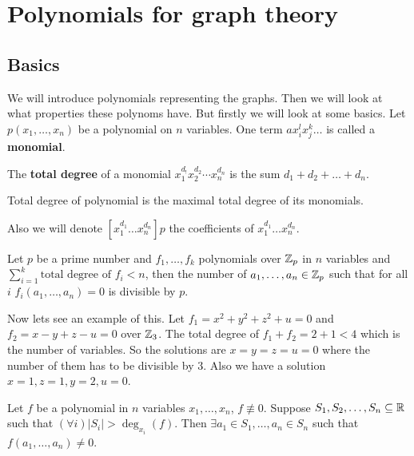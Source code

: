 \chapter{Polynomials for graph theory}

\section{Basics}

We will introduce polynomials representing the graphs. Then we will look at what properties these polynoms have. But firstly we will look at some basics. Let $p(x_{1}, \dots, x_{n})$ be a polynomial on $n$ variables. One term $ax_{i}^{l} x_{j}^k \dots$ is called a \textbf{monomial}.

\begin{defn}
	The \textbf{total degree} of a monomial $x_{1}^{d_{!}} x_{2}^{d_{2}} \cdots x_{n}^{d_{n}}$ is the sum $d_{1} + d_{2} + \dots + d_{n}$.
\end{defn}

\begin{defn}
	Total degree of polynomial is the maximal total degree of its monomials.
\end{defn}

Also we will denote $[x_{1}^{d_{1}} \dots x_{n}^{d_{n}}]p$ the coefficients of $x_{1}^{d_{1}} \dots x_{n}^{d_{n}}$.

\begin{thm}
	Let $p$ be a prime number and $f_{1}, \dots, f_{k}$ polynomials over $\mathbb{Z}_{p}$ in $n$ variables and $\sum_{i = 1}^{k} \text{total degree of } f_{i} < n$, then the number of $a_{1}, \dots, a_{n} \in \mathbb{Z}_{p}$ such that for all $i$ $f_{i}(a_{1}, \dots, a_{n}) = 0$ is divisible by $p$.
\end{thm}

Now lets see an example of this. Let $f_{1} = x^2 + y^2 + z^2 + u =0$ and $f_{2} = x - y + z - u = 0$ over $\mathbb{Z}_{3}$. The total degree of $f_{1} + f_{2} = 2 + 1 < 4$ which is the number of variables. So the solutions are $x = y = z = u =0$ where the number of them has to be divisible by $3$. Also we have a solution $x = 1, z = 1, y = 2, u =0$.

\begin{thm}
	Let $f$ be a polynomial in $n$ variables $x_{1}, \dots, x_{n}$, $f \not\equiv 0$. Suppose $S_{1}, S_{2}, \dots, S_{n} \subseteq \mathbb{R}$ such that $(\forall i) |S_{i}| > \deg_{x_{i}}(f)$. Then $\exists a_{1} \in S_{1}, \dots, a_{n} \in S_{n}$ such that $f(a_{1}, \dots, a_{n}) \neq 0$.
\end{thm}

